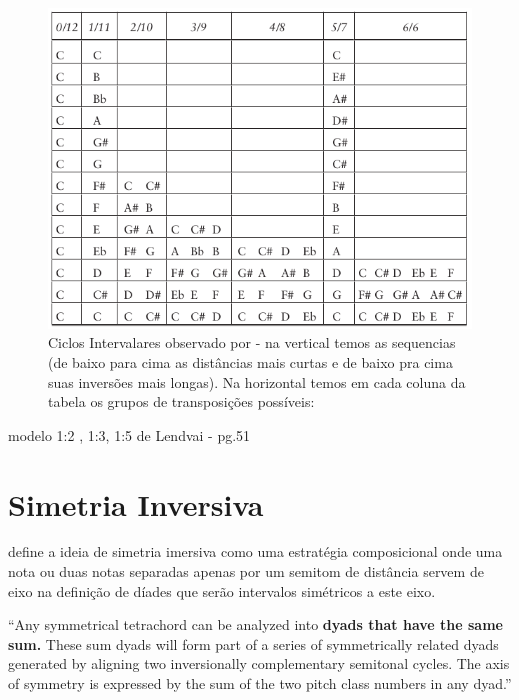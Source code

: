 \documentclass[
	12pt,				%
	openright,			%
	twoside,			%
	a4paper,			%
	english,			%
	french,				%
	spanish,			%
	brazil				%
	]{abntex2}
\begin{document}
\begin{figure}[!h]
	\caption{\label{fig_grafico}Ciclos Intervalares observado por  - na vertical temos as sequencias (de baixo para cima as distâncias mais curtas e de baixo pra cima suas inversões mais longas). Na horizontal temos em cada coluna da tabela os grupos de transposições possíveis: }
	\begin{center}
	    \includegraphics[scale=0.5]{antokoletz/ciclos_intervalares_table2012.png}
	\end{center}
\end{figure}



modelo 1:2 , 1:3, 1:5 de Lendvai - pg.51


\pagebreak
\section{Simetria Inversiva}

 define a ideia de simetria imersiva como uma estratégia composicional onde uma nota ou duas notas separadas apenas por um semitom de distância servem de eixo na definição de díades que serão intervalos simétricos a este eixo.

\begin{citacao}
“Any symmetrical tetrachord can be analyzed into\textbf{ dyads that have the same sum.} These sum dyads will form part of a series of symmetrically related dyads generated by aligning two inversionally complementary semitonal cycles. The axis of symmetry is expressed by the sum of the two pitch class numbers in any dyad.”
\cite[ p.72]{antokoletz1984music}
\end{citacao}
\end{document}
